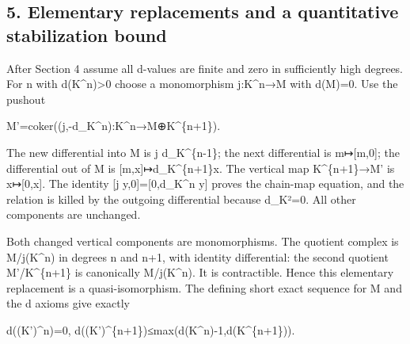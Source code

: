 \documentclass[11pt]{article}
\begin{document}
\subsection{5. Elementary replacements and a quantitative stabilization bound}\label{proofs-9746-10132-elementary-replacements-and-a-quantitative-stabilization-bound}

After Section 4 assume all d-values are finite and zero in sufficiently high degrees. For n with d(K\textasciicircum{}n)\allowbreak{}>0 choose a monomorphism j:\allowbreak{}K\textasciicircum{}n\allowbreak{}→M with d(M)\allowbreak{}\allowbreak{}=0. Use the pushout

M'\allowbreak{}=coker((j,\allowbreak{}-d\_\allowbreak{}K\textasciicircum{}n)\allowbreak{}:\allowbreak{}K\textasciicircum{}n\allowbreak{}→M\allowbreak{}⊕K\textasciicircum{}\{n\allowbreak{}+1\})\allowbreak{}.

The new differential into M is j d\_\allowbreak{}K\textasciicircum{}\{n-1\}; the next differential is m\allowbreak{}↦[m,\allowbreak{}0]\allowbreak{}; the differential out of M\textquotesingle{} is [m,\allowbreak{}x]\allowbreak{}\allowbreak{}↦d\_\allowbreak{}K\textasciicircum{}\{n\allowbreak{}+1\}x. The vertical map K\textasciicircum{}\{n\allowbreak{}+1\}\allowbreak{}→M' is x\allowbreak{}↦[0,\allowbreak{}x]\allowbreak{}. The identity {[}j y,\allowbreak{}0]\allowbreak{}\allowbreak{}=[0,\allowbreak{}d\_\allowbreak{}K\textasciicircum{}n y]\allowbreak{} proves the chain-map equation,\allowbreak{} and the relation is killed by the outgoing differential because d\_\allowbreak{}K²\allowbreak{}=0. All other components are unchanged.

Both changed vertical components are monomorphisms. The quotient complex is M/\allowbreak{}j(K\textasciicircum{}n)\allowbreak{} in degrees n and n\allowbreak{}+1,\allowbreak{} with identity differential:\allowbreak{} the second quotient M'/\allowbreak{}K\textasciicircum{}\{n\allowbreak{}+1\} is canonically M/\allowbreak{}j(K\textasciicircum{}n)\allowbreak{}. It is contractible. Hence this elementary replacement is a quasi-isomorphism. The defining short exact sequence for M\textquotesingle{} and the d axioms give exactly

d((K')\allowbreak{}\textasciicircum{}n)\allowbreak{}\allowbreak{}=0,\allowbreak{} d((K')\allowbreak{}\textasciicircum{}\{n\allowbreak{}+1\})\allowbreak{}≤max(d(K\textasciicircum{}n)\allowbreak{}-1,\allowbreak{}d(K\textasciicircum{}\{n\allowbreak{}+1\})\allowbreak{})\allowbreak{}.
\end{document}
